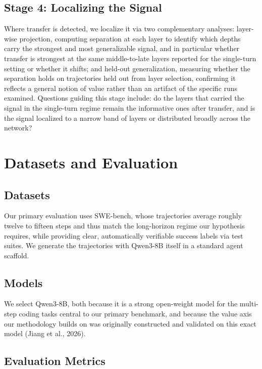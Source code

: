 \documentclass{article}
\begin{document}
\subsection{Stage 4: Localizing the Signal}

Where transfer is detected, we localize it via two complementary analyses: layer-wise projection, computing separation at each layer to identify which depths carry the strongest and most generalizable signal, and in particular whether transfer is strongest at the same middle-to-late layers reported for the single-turn setting or whether it shifts; and held-out generalization, measuring whether the separation holds on trajectories held out from layer selection, confirming it reflects a general notion of value rather than an artifact of the specific runs examined. Questions guiding this stage include: do the layers that carried the signal in the single-turn regime remain the informative ones after transfer, and is the signal localized to a narrow band of layers or distributed broadly across the network?

\section{Datasets and Evaluation}

\subsection{Datasets}

Our primary evaluation uses SWE-bench, whose trajectories average roughly twelve to fifteen steps and thus match the long-horizon regime our hypothesis requires, while providing clear, automatically verifiable success labels via test suites. We generate the trajectories with Qwen3-8B itself in a standard agent scaffold.

\subsection{Models}

We select Qwen3-8B, both because it is a strong open-weight model for the multi-step coding tasks central to our primary benchmark, and because the value axis our methodology builds on was originally constructed and validated on this exact model (Jiang et al., 2026).

\subsection{Evaluation Metrics}
\end{document}
